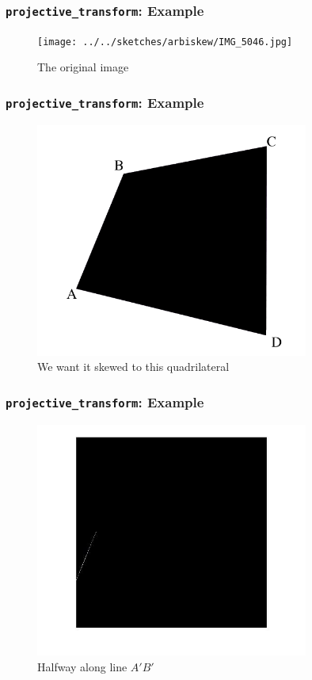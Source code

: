 \documentclass{beamer}
\begin{document}
\begin{frame}
	\frametitle{{\tt projective\_transform}: Example}
	\begin{figure}
		\centering
		\texttt{[image: ../../sketches/arbiskew/IMG\_5046.jpg]}
		\caption{The original image}
	\end{figure}
\end{frame}

\begin{frame}
	\frametitle{{\tt projective\_transform}: Example}
	\begin{figure}
		\centering
		\includegraphics[width=0.8\textwidth]{images/skew_example/skew_rectangle.png}
		\caption{We want it skewed to this quadrilateral}
	\end{figure}
\end{frame}

\begin{frame}
	\frametitle{{\tt projective\_transform}: Example}
	\begin{figure}
		\centering
		\includegraphics[width=0.8\textwidth]{images/skew_example/projected_halfway_line.jpg}
		\caption{Halfway along line $A\prime B\prime$}
	\end{figure}
\end{frame}
\end{document}
